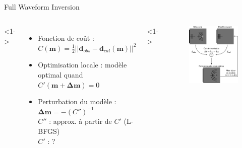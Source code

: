 \subsection*{}
\begin{frame}{Full Waveform Inversion}
	\begin{columns}
		<1->
		\begin{itemize}
			\item<2-> Fonction de coût : $C(\bm{m})=\frac{1}{2}||\bm{d}_{obs}-\bm{d}_{cal}(\bm{m})||^{2}$\\[0.3cm]
			\item<3-> Optimisation locale : modèle optimal quand $C'(\bm{m} + \bm{\Delta m})=0$\\[0.3cm]
			\item<4-4> Perturbation du modèle : $\bm{\Delta m}=-(C'')^{-1}$\\[0.3cm]
			$C''$ : approx. à partir de $C'$ (L-BFGS)\\
			$C'$ : ?
		\end{itemize}

		
		<1->
		\begin{figure}
			\centering
			\hspace{-0.3cm}\includegraphics[width=\textwidth]{img/schema_fwi2.png}
		\end{figure}
	\end{columns}
	
\end{frame}


